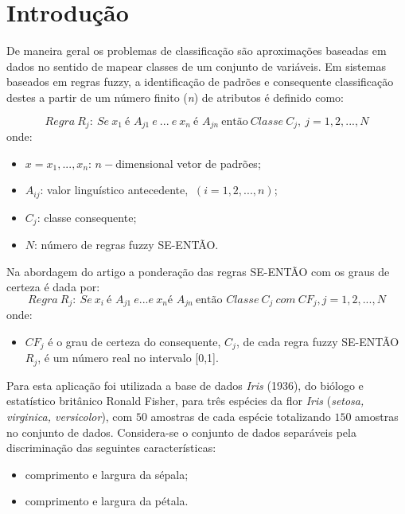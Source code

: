 \documentclass[12pt,a4paper]{article}
\numberwithin{equation}{section}
\begin{document}
\section{Introdução}

De maneira geral os problemas de classificação são aproximações baseadas em dados  no sentido de mapear classes de um conjunto de variáveis. Em sistemas baseados em regras fuzzy, a identificação de padrões e consequente classificação destes a partir de um número finito (\textit{n}) de atributos é definido como:

\begin{equation} \label{eq:eq1}
Regra~R_{j}:~Se~x_{1}~ \text{é }A_{j1}~e~...~e~x_{n}~\text{é }A_{jn}~\text{então}~Classe~C_{j},~j=1,2,...,N
\end{equation}
onde:
\begin{itemize}
\item $x={x_{1},...,x_{n}}$: $n-$dimensional vetor de padrões;
\item $A_{ij}$: valor linguístico antecedente, $~(i=1,2,...,n)$;
\item $C_{j}$: classe consequente;
\item $N$: número de regras fuzzy SE-ENTÃO.
\end{itemize}

Na abordagem do artigo a ponderação das regras SE-ENTÃO com os graus de certeza é dada por:
\begin{equation} \label{eq:eq2}
Regra~R_{j}:~Se~x_{i}~\text{é } A_{j1}~e...e~x_{n} \text{é } A_{jn}~\text{então }Classe~C_{j}~com~CF_{j}, j=1,2,...,N
\end{equation}
onde:
\begin{itemize} 
\item $CF_{j}$ é o grau de certeza do consequente, $C_{j}$, de cada regra fuzzy SE-ENTÃO $R_{j}$, é um número real no intervalo [0,1].
\end{itemize}

Para esta aplicação foi utilizada a base de dados \textit{Iris} (1936), do biólogo e estatístico britânico Ronald Fisher, para três espécies da flor \textit{Iris} (\textit{setosa, virginica, versicolor}), com $50$ amostras de cada espécie totalizando $150$ amostras no conjunto de dados. Considera-se o conjunto de dados separáveis pela discriminação das seguintes características:

\begin{itemize}
\item comprimento e largura da sépala;
\item comprimento e largura da pétala.
\end{itemize}
\end{document}
